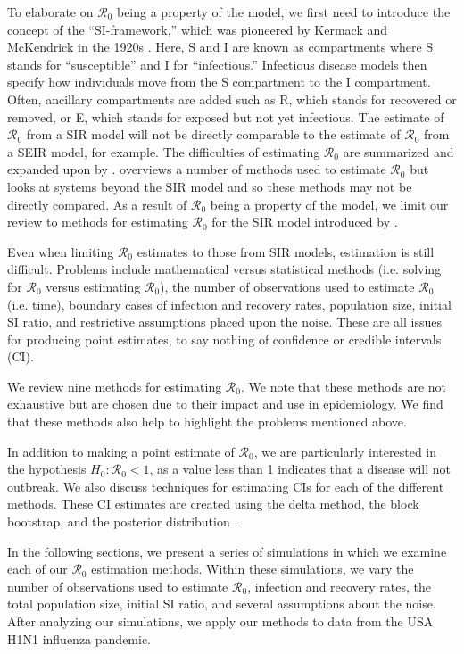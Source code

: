 \documentclass[12pt]{article}
\newcommand{\wxxsir}{nine } %
\newcommand{\rr}{\ensuremath{\mathcal{R}_0}}
\begin{document}
To elaborate on $\rr$ being a property of the model, we first need to introduce the concept of the ``SI-framework,'' which was pioneered by Kermack and McKendrick in the 1920s \citep{getz2006}.   Here, S and I are known as compartments where S stands for ``susceptible'' and I for ``infectious.'' Infectious disease models then specify how individuals move from the S compartment to the I compartment.  Often, ancillary compartments are added such as R, which stands for recovered or removed, or E, which stands for exposed but not yet infectious.  The estimate of $\rr$ from a SIR model will not be directly comparable to the estimate of $\rr$ from a SEIR model, for example.  The difficulties of estimating $\rr$ are summarized and expanded upon by \cite{li2011}.  \cite{driessche2017} overviews a number of methods used to estimate $\rr$ but looks at systems beyond the SIR model and so these methods may not be directly compared.   As a result of $\rr$ being a property of the model, we limit our review to methods for estimating $\rr$ for the SIR model introduced by \cite{Kermack700}.

Even when limiting $\rr$ estimates to those from SIR models, estimation is still difficult.  Problems include mathematical versus statistical methods (i.e. solving for $\rr$ versus estimating $\rr$), the number of observations used to estimate $\rr$ (i.e. time), boundary cases of infection and recovery rates, population size, initial SI ratio, and restrictive assumptions placed upon the noise.  These are all issues for producing point estimates, to say nothing of confidence or credible intervals (CI).

We review \wxxsir methods for estimating $\rr$.  We note that these methods are not exhaustive but are chosen due to their impact and use in epidemiology.  We find that these methods also help to highlight the problems mentioned above.

In addition to making a point estimate of $\rr$, we are particularly interested in the hypothesis  $H_0: \rr < 1$, as a value less than 1 indicates that a disease will not outbreak.  We also discuss techniques for estimating CIs for each of the different methods.  These CI estimates are created using the delta method, the block bootstrap, and the posterior distribution \citep{cao1999,wasserman2004}.

In the following sections, we present a series of simulations in which we examine each of our $\rr$ estimation methods.  Within these simulations, we vary the number of observations used to estimate $\rr$, infection and recovery rates, the total population size, initial SI ratio, and several assumptions about the noise.  After analyzing our simulations, we apply our methods to data from the USA H1N1 influenza pandemic.
\end{document}
